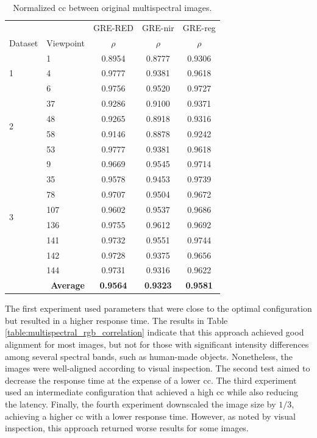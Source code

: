 \renewcommand{\arraystretch}{1.05}
\begin{table}[H]
    \caption{Normalized \acrshort{cc} between original multispectral images. }
    \label{table:multispectral_base_correlation}
    \begin{tabular}{l@{\hskip 0.3in}l|c@{\hskip 0.3in}c@{\hskip 0.3in}c}
        \toprule
        & & GRE-RED & GRE-\acrshort{nir} & GRE-\acrshort{reg} \\
        \cmidrule{1-5}
        Dataset & Viewpoint & $\rho$ & $\rho$ & $\rho$ \\
        \cmidrule{1-5}
        \multirow{3}{*}{1} & 1 & 0.8954 & 0.8777 & 0.9306\\
        & 4 & 0.9777 & 0.9381 & 0.9618\\
        & 6 & 0.9756 & 0.9520 & 0.9727\\
        \cmidrule{1-5}
        \multirow{4}{*}{2} & 37 & 0.9286 & 0.9100 & 0.9371\\
        & 48 & 0.9265 & 0.8918 & 0.9316\\
        & 58 & 0.9146 & 0.8878 & 0.9242\\
        & 53 & 0.9777 & 0.9381 & 0.9618\\
        \cmidrule{1-5}
        \multirow{8}{*}{3} & 9 & 0.9669 & 0.9545 & 0.9714\\
        & 35 & 0.9578 & 0.9453 & 0.9739\\
        & 78 & 0.9707 & 0.9504 & 0.9672\\
        & 107 & 0.9602 & 0.9537 & 0.9686\\
        & 136 & 0.9755 & 0.9612 & 0.9692\\
        & 141 & 0.9732 & 0.9551 & 0.9744\\
        & 142 & 0.9728 & 0.9375 & 0.9656\\
        & 144 & 0.9731 & 0.9316 & 0.9622\\
        \cmidrule{1-5}
        \multicolumn{2}{r|}{\textbf{Average}} & \textbf{0.9564} & \textbf{0.9323} & \textbf{0.9581}\\
        \bottomrule
    \end{tabular}
    \normalsize
\end{table}
\renewcommand{\arraystretch}{1}

The first experiment used parameters that were close to the optimal configuration but resulted in a higher response time. The results in Table \ref{table:multispectral_rgb_correlation} indicate that this approach achieved good alignment for most images, but not for those with significant intensity differences among several spectral bands, such as human-made objects. Nonetheless, the images were well-aligned according to visual inspection. The second test aimed to decrease the response time at the expense of a lower \acrshort{cc}. The third experiment used an intermediate configuration that achieved a high \acrshort{cc} while also reducing the latency. Finally, the fourth experiment downscaled the image size by $1/3$, achieving a higher \acrshort{cc} with a lower response time. However, as noted by visual inspection, this approach returned worse results for some images. 

